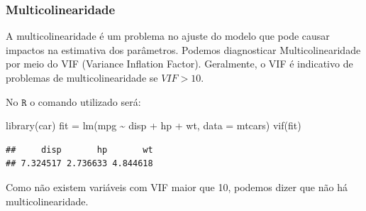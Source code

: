 \documentclass[
]{book}
\newenvironment{Shaded}{\begin{snugshade}}{\end{snugshade}}
\newcommand{\AttributeTok}[1]{\textcolor[rgb]{0.77,0.63,0.00}{#1}}
\newcommand{\FunctionTok}[1]{\textcolor[rgb]{0.00,0.00,0.00}{#1}}
\newcommand{\NormalTok}[1]{#1}
\newcommand{\OtherTok}[1]{\textcolor[rgb]{0.56,0.35,0.01}{#1}}
\newcommand{\SpecialCharTok}[1]{\textcolor[rgb]{0.00,0.00,0.00}{#1}}
\begin{document}
\hypertarget{multicolinearidade}{%
\subsubsection{\texorpdfstring{\textbf{Multicolinearidade}}{Multicolinearidade}}\label{multicolinearidade}}

A multicolinearidade é um problema no ajuste do modelo que pode causar impactos na estimativa dos parâmetros. Podemos diagnosticar Multicolinearidade por meio do VIF (Variance Inflation Factor). Geralmente, o VIF é indicativo de problemas de multicolinearidade se \(VIF>10\).

No \(\texttt{R}\) o comando utilizado será:

\begin{Shaded}
\begin{Highlighting}[]
\FunctionTok{library}\NormalTok{(car)}
\NormalTok{fit }\OtherTok{=} \FunctionTok{lm}\NormalTok{(mpg }\SpecialCharTok{\textasciitilde{}}\NormalTok{ disp }\SpecialCharTok{+}\NormalTok{ hp }\SpecialCharTok{+}\NormalTok{ wt, }\AttributeTok{data =}\NormalTok{ mtcars)}
\FunctionTok{vif}\NormalTok{(fit)}
\end{Highlighting}
\end{Shaded}

\begin{verbatim}
##     disp       hp       wt 
## 7.324517 2.736633 4.844618
\end{verbatim}

Como não existem variáveis com VIF maior que 10, podemos dizer que não há multicolinearidade.

  
\end{document}
